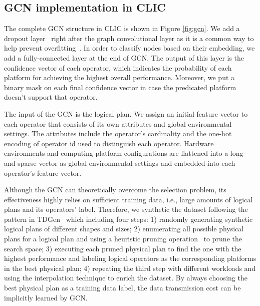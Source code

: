 \subsection{GCN implementation in CLIC}
The complete GCN structure in CLIC is shown in Figure \ref{fig:gcn}. We add a dropout layer~\cite{srivastava2014dropout} right after the graph convolutional layer as it is a common way to help prevent overfitting~\cite{baldi2013understanding}. In order to classify nodes based on their embedding, we add a fully-connected layer at the end of GCN. The output of this layer is the confidence vector of each operator, which indicates the probability of each platform for achieving the highest overall performance. Moreover, we put a binary mask on each final confidence vector in case the predicated platform doesn’t support that operator.

The input of the GCN is the logical plan. We assign an initial feature vector to each operator that consists of its own attributes and global environmental settings. The attributes include the operator’s cardinality and the one-hot encoding of operator id used to distinguish each operator. Hardware environments and computing platform configurations are flattened into a long and sparse vector as global environmental settings and embedded into each operator’s feature vector. 

Although the GCN can theoretically overcome the selection problem, its effectiveness highly relies on sufficient training data, i.e., large amounts of logical plans and its operators’ label. Therefore, we synthetic the dataset following the pattern in TDGen~\cite{kaoudi2020ml} which including four steps: 1) randomly generating synthetic logical plans of different shapes and sizes; 2) enumerating all possible physical plans for a logical plan and using a heuristic pruning operation~\cite{kaoudi2020ml} to prune the search space; 3) executing each pruned physical plan to find the one with the highest performance and labeling logical operators as the corresponding platforms in the best physical plan; 4) repeating the third step with different workloads and using the interpolation technique to enrich the dataset. By always choosing the best physical plan as a training data label, the data transmission cost can be implicitly learned by GCN.

